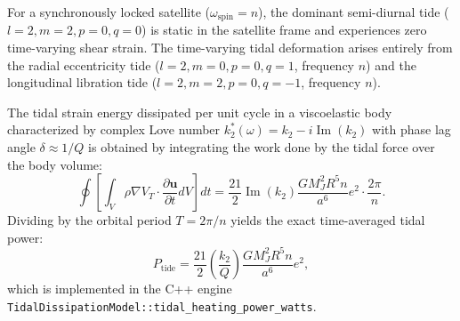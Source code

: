 \documentclass[11pt,a4paper]{article}
\begin{document}
For a synchronously locked satellite ($\omega_{\mathrm{spin}} = n$), the dominant semi-diurnal tide ($l=2, m=2, p=0, q=0$) is static in the satellite frame and experiences zero time-varying shear strain. The time-varying tidal deformation arises entirely from the radial eccentricity tide ($l=2, m=0, p=0, q=1$, frequency $n$) and the longitudinal libration tide ($l=2, m=2, p=0, q=-1$, frequency $n$).

The tidal strain energy dissipated per unit cycle in a viscoelastic body characterized by complex Love number $k_2^*(\omega) = k_2 - i \operatorname{Im}(k_2)$ with phase lag angle $\delta \approx 1/Q$ is obtained by integrating the work done by the tidal force over the body volume:
\begin{equation}
\oint \left[ \int_V \rho \nabla V_T \cdot \frac{\partial \mathbf{u}}{\partial t} dV \right] dt = \frac{21}{2} \operatorname{Im}(k_2) \frac{G M_J^2 R^5 n}{a^6} e^2 \cdot \frac{2\pi}{n}.
\end{equation}
Dividing by the orbital period $T = 2\pi/n$ yields the exact time-averaged tidal power:
\begin{equation}
P_{\mathrm{tide}} = \frac{21}{2} \left(\frac{k_2}{Q}\right) \frac{G M_J^2 R^5 n}{a^6} e^2,
\end{equation}
which is implemented in the C++ engine \texttt{TidalDissipationModel::tidal\_heating\_power\_watts}.
\end{document}
